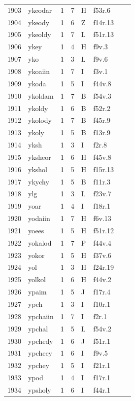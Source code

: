\documentclass[11pt,a4paper]{article}
\begin{document}
\begin{landscape}
\begin{longtable}{@{}r>{\ttfamily}lrrl>{\ttfamily}l>{\raggedright\arraybackslash}p{80mm}>{\raggedright\arraybackslash}p{36mm}@{}}
1903 & ykeodar & 1 & 7 & H & f53r.6 &  & \\
1904 & ykeody & 1 & 6 & Z & f14r.13 &  & \\
1905 & ykeoldy & 1 & 7 & L & f51r.13 &  & \\
1906 & ykey & 1 & 4 & H & f9v.3 &  & \\
1907 & yko & 1 & 3 & L & f9v.6 &  & \\
1908 & ykoaiin & 1 & 7 & I & f3v.1 &  & \\
1909 & ykoda & 1 & 5 & I & f44v.8 &  & \\
1910 & ykoldam & 1 & 7 & B & f54v.3 &  & \\
1911 & ykoldy & 1 & 6 & B & f52r.2 &  & \\
1912 & ykolody & 1 & 7 & B & f45r.9 &  & \\
1913 & ykoly & 1 & 5 & B & f13r.9 &  & \\
1914 & yksh & 1 & 3 & I & f2r.8 &  & \\
1915 & yksheor & 1 & 6 & H & f45v.8 &  & \\
1916 & ykshol & 1 & 5 & H & f15r.13 &  & \\
1917 & ykychy & 1 & 5 & B & f11r.3 &  & \\
1918 & ylg & 1 & 3 & L & f23v.7 &  & \\
1919 & yoar & 1 & 4 & I & f18r.1 &  & \\
1920 & yodaiin & 1 & 7 & H & f6v.13 &  & \\
1921 & yoees & 1 & 5 & H & f51r.12 &  & \\
1922 & yokalod & 1 & 7 & P & f44v.4 &  & \\
1923 & yokor & 1 & 5 & H & f37v.6 &  & \\
1924 & yol & 1 & 3 & H & f24r.19 &  & \\
1925 & yolkol & 1 & 6 & H & f44v.2 &  & \\
1926 & ypaim & 1 & 5 & J & f17r.4 &  & \\
1927 & ypch & 1 & 3 & I & f10r.1 &  & \\
1928 & ypchaiin & 1 & 7 & I & f2r.1 &  & \\
1929 & ypchal & 1 & 5 & L & f54v.2 &  & \\
1930 & ypchedy & 1 & 6 & J & f51r.1 &  & \\
1931 & ypcheey & 1 & 6 & I & f9v.5 &  & \\
1932 & ypchey & 1 & 5 & I & f21r.1 &  & \\
1933 & ypod & 1 & 4 & I & f17r.1 &  & \\
1934 & ypsholy & 1 & 6 & I & f44r.1 &  & \\

\end{longtable}
\end{landscape}
\end{document}

